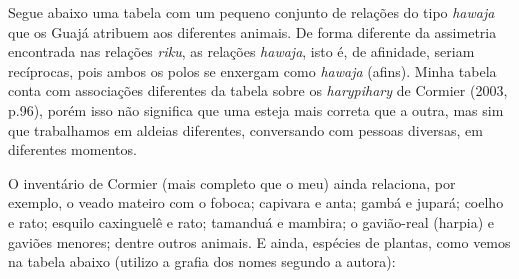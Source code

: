 Segue abaixo uma tabela com um pequeno conjunto de relações do tipo
\emph{hawaja} que os Guajá atribuem aos diferentes animais. De forma
diferente da assimetria encontrada nas relações \emph{riku}, as relações
\emph{hawaja}, isto é, de afinidade, seriam recíprocas, pois ambos os
polos se enxergam como \emph{hawaja} (afins). Minha tabela conta com
associações diferentes da tabela sobre os \emph{harypihary} de Cormier
(2003, p.96), porém isso não significa que uma esteja mais correta que a
outra, mas sim que trabalhamos em aldeias diferentes, conversando com
pessoas diversas, em diferentes momentos.



O inventário de Cormier (mais completo que o meu) ainda relaciona, por
exemplo, o veado mateiro com o foboca; capivara e anta; gambá e jupará;
coelho e rato; esquilo caxinguelê e rato; tamanduá e mambira; o
gavião-real (harpia) e gaviões menores; dentre outros animais. E ainda,
espécies de plantas, como vemos na tabela abaixo (utilizo a grafia dos
nomes segundo a autora):

